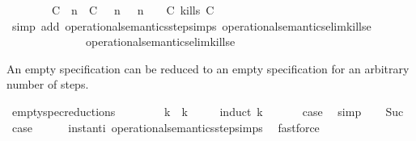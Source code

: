 \begin{isabellebody}
\ \ \ \ \ \ \ \ {\isacharparenleft}{\isacharparenleft}C\ {\isasymUp}\ n{\isacharparenright}\ {\isacharhash}\ {\isacharparenleft}C\ {\isasymnot}{\isasymUp}\ {\isasymge}\ n{\isacharparenright}\ {\isacharhash}\ {\isasymGamma}{\isacharparenright}{\isacharcomma}\ n\ {\isasymturnstile}\ {\isasymPsi}\ {\isasymtriangleright}\ {\isacharparenleft}{\isacharparenleft}C\ kills\ C\ {\isacharhash}\ {\isasymPhi}{\isacharparenright}\ {\isacharbraceright}{\isacartoucheclose}\isanewline
%
\isadelimproof
%
\endisadelimproof
%
\isatagproof
{}\isamarkupfalse%
\ {\isacharparenleft}simp\ add{\isacharcolon}\ operational{\isacharunderscore}semantics{\isacharunderscore}step{\isachardot}simps\ operational{\isacharunderscore}semantics{\isacharunderscore}elim{\isachardot}kills{\isacharunderscore}e{}\isanewline
\ \ \ \ \ \ \ \ \ \ \ \ \ \ operational{\isacharunderscore}semantics{\isacharunderscore}elim{\isachardot}kills{\isacharunderscore}e{}{\isacharparenright}%
\endisatagproof
{\isafoldproof}%
%
\isadelimproof
%
\endisadelimproof
%
\begin{isamarkuptext}%
An empty specification can be reduced to an empty specification for 
  an arbitrary number of steps.%
\end{isamarkuptext}\isamarkuptrue%
\isamarkupfalse%
\ empty{\isacharunderscore}spec{\isacharunderscore}reductions{\isacharcolon}\isanewline
\ \ {\isacartoucheopen}{\isacharparenleft}{\isacharbrackleft}{\isacharbrackright}{\isacharcomma}\ {}\ {\isasymturnstile}\ {\isacharbrackleft}{\isacharbrackright}\ {\isasymtriangleright}\ {\isacharbrackleft}{\isacharbrackright}{\isacharparenright}\ {\isasymhookrightarrow}\isactrlbsup k\isactrlesup \ {\isacharparenleft}{\isacharbrackleft}{\isacharbrackright}{\isacharcomma}\ k\ {\isasymturnstile}\ {\isacharbrackleft}{\isacharbrackright}\ {\isasymtriangleright}\ {\isacharbrackleft}{\isacharbrackright}{\isacharparenright}{\isacartoucheclose}\isanewline
%
\isadelimproof
%
\endisadelimproof
%
\isatagproof
{}\isamarkupfalse%
\ {\isacharparenleft}induct\ k{\isacharparenright}\isanewline
\ \ \isamarkupfalse%
\ {}\ \isamarkupfalse%
\ {\isacharquery}case\ \isamarkupfalse%
\ simp\isanewline
{}\isamarkupfalse%
\isanewline
\ \ \isamarkupfalse%
\ Suc\ \isamarkupfalse%
\ {\isacharquery}case\isanewline
\ \ \ \ \isamarkupfalse%
\ instant{\isacharunderscore}i\ operational{\isacharunderscore}semantics{\isacharunderscore}step{\isachardot}simps\ \isamarkupfalse%
\ fastforce\ \isanewline
{}\isamarkupfalse%
%
\endisatagproof
{\isafoldproof}%
%
\isadelimproof
\isanewline
%
\endisadelimproof
%
\isadelimtheory
\isanewline
%
\endisadelimtheory
%
\isatagtheory
{}\isamarkupfalse%
%
\endisatagtheory
{\isafoldtheory}%
%
\isadelimtheory
%
\endisadelimtheory
%
\end{isabellebody}%
